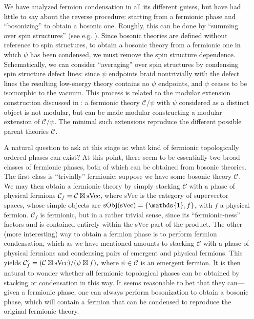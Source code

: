 \documentclass[12pt,a4paper]{article}
\newcommand{\unit}{\mathds{1}}
\newcommand{\mcc}{\mathcal{C}}
\begin{document}
We have analyzed fermion condensation in all its different guises, but have had little to say about the reverse procedure:
starting from a fermionic phase and ``bosonizing'' to obtain a bosonic one. Roughly, this can be done by 
``summing over spin structures'' (see e.g. \cite{bhardwaj2016,kapustin2017}).
Since bosonic theories are defined without reference to spin structures, to obtain a bosonic theory from a fermionic 
one in which $\psi$ has been condensed, we must remove the spin structure dependence. 
Schematically, we can consider ``averaging'' over spin structures by condensing spin structure defect lines: since $\psi$ endpoints braid nontrivially with the defect lines the resulting low-energy theory contains no 
$\psi$ endpoints, and $\psi$ ceases to be isomorphic to the vacuum. 
This process is related to the modular extension construction discussed in \cite{Lan2016b}: a fermionic theory $\mcc /\psi$ with $\psi$ considered as a distinct object is not modular, but can be made modular
constructing a modular extension of $\mcc / \psi$. The minimal such extensions reproduce the different possible 
parent theories $\mcc$. 

A natural question to ask at this stage is: what kind of fermionic topologically ordered phases can exist? 
At this point, there seem to be essentially two broad classes of fermionic phases, both of which can be obtained from bosonic theories. 
The first class is ``trivially'' fermionic: suppose we have some bosonic theory $\mcc$. 
We may then obtain a fermionic theory by simply stacking $\mcc$ with a phase of physical fermions $\mcc_{f} = \mcc \boxtimes {\rm sVec}$, where sVec is the category of supervector spaces, whose simple objects are ${\rm sObj}({\rm sVec}) = \{\unit,f\}$, with $f$ a physical fermion. 
$\mcc_f$ is fermionic, but in a rather trivial sense, since its ``fermionic-ness'' factors and is contained entirely within the sVec part of the product. 
The other (more interesting) way to obtain a fermion phase is to perform fermion condensation, which as we have 
mentioned amounts to stacking $\mcc$ with a phase of physical fermions and condensing pairs of emergent and physical fermions. 
This yields $\mcc_f' = (\mcc \boxtimes {\rm sVec}) / (\psi \boxtimes f),$
where $\psi \in \mcc$ is an emergent fermion. 
It is then natural to wonder whether all fermionic topological phases can be obtained by stacking or condensation in this way. 
It seems reasonable to bet that they can---given a fermionic phase, one can always perform bosonization 
to obtain a bosonic phase, which will contain a fermion that can be condensed to reproduce the 
original fermionic theory. 
\end{document}
